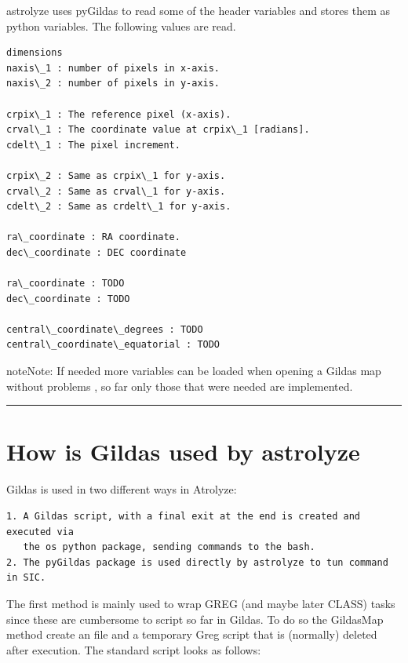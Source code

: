 \documentclass[a4paper,10pt,english]{sphinxmanual}
\begin{document}
astrolyze uses pyGildas to read some of the header variables and stores them as
python variables. The following values are read.

\begin{Verbatim}[commandchars=\\\{\}]
dimensions
naxis\_1 : number of pixels in x-axis.
naxis\_2 : number of pixels in y-axis.

crpix\_1 : The reference pixel (x-axis).
crval\_1 : The coordinate value at crpix\_1 [radians].
cdelt\_1 : The pixel increment.

crpix\_2 : Same as crpix\_1 for y-axis.
crval\_2 : Same as crval\_1 for y-axis.
cdelt\_2 : Same as crdelt\_1 for y-axis.

ra\_coordinate : RA coordinate.
dec\_coordinate : DEC coordinate

ra\_coordinate : TODO
dec\_coordinate : TODO

central\_coordinate\_degrees : TODO
central\_coordinate\_equatorial : TODO
\end{Verbatim}

\begin{notice}{note}{Note:}
If needed more variables can be loaded when opening a Gildas map without
problems , so far only those that were needed are implemented.
\end{notice}


\bigskip\hrule{}\bigskip



\section{How is Gildas used by astrolyze}
\label{manual:how-is-gildas-used-by-astrolyze}
Gildas is used in two different ways in Atrolyze:

\begin{Verbatim}[commandchars=\\\{\}]
1. A Gildas script, with a final exit at the end is created and executed via
   the os python package, sending commands to the bash.
2. The pyGildas package is used directly by astrolyze to tun command in SIC.
\end{Verbatim}

The first method is mainly used to wrap GREG (and maybe later CLASS) tasks
since these are cumbersome to script so far in Gildas. To do so the GildasMap
method create an  file and a temporary Greg script that is (normally)
deleted after execution. The standard script looks as follows:
\end{document}
